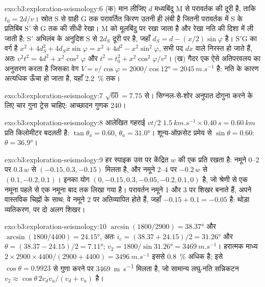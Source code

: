 \begin{solution}{exo:b3:exploration-seismology:6}
(क) मान लीजिए $d$ मध्यबिंदु M से परावर्तक की दूरी है, ताकि
$t_0 = 2d/v$। स्रोत S से ग्राही G तक परावर्तित किरण उतनी ही लंबी है जितनी
परावर्तक में S के प्रतिबिंब S$'$ से G तक की सीधी रेखा। M को मूलबिंदु पर रखा जाता है और रेखा नति की दिशा में ली जाती है;
S$'$ अभिलंब के अनुदिश S से $2d_S$ दूरी पर है, जहाँ
$d_S = d - (x/2)\sin\varphi$ है। S$'$G का वर्ग है
$x^2 + 4d_S^2 + 4d_Sx\sin\varphi = x^2 + 4d^2 - x^2\sin^2\varphi$, सभी पद
$dx$ वाले निरस्त हो जाते हैं, अतः $v^2t^2 = 4d^2 + x^2\cos^2\varphi$ और
$t^2 = t_0^2 + x^2\cos^2\varphi/v^2$। (ख) गैदर एक ऐसे अतिपरवलय का अनुसरण करता है जिसका वेग
$V = v/\cos\varphi = 2000/\cos\ang{12} = \qty{2045}{m.s^{-1}}$ है: नति के कारण
 अत्यधिक ऊँचा हो जाता है, यहाँ \qty{2.2}{\percent} तक।
\end{solution}

\begin{solution}{exo:b3:exploration-seismology:7}
$\sqrt{60} = 7.75$ से। सिग्नल-से-शोर अनुपात दोगुना करने के लिए चार गुना
ट्रेस चाहिए: आच्छादन गुणक 240।
\end{solution}

\begin{solution}{exo:b3:exploration-seismology:8}
आलेखित गहराई $vt/2$ $\qty{1.5}{km.s^{-1}}\times\qty{0.40}{s}
= \qty{0.60}{km}$ प्रति किलोमीटर बदलती है: $\tan\theta_a = 0.60$, $\theta_a = \ang{31.0}$।
शून्य-ऑफ़सेट प्रमेय से $\sin\theta = 0.60$: $\theta = \ang{36.9}$।
\end{solution}

\begin{solution}{exo:b3:exploration-seismology:9}
हर स्पाइक उस पर केंद्रित $w$ की एक प्रति रखता है: नमूने 0--2 पर $0.3\,w$ से
$(-0.15, 0.3, -0.15)$ मिलता है, और नमूने 2--4 पर $-0.2\,w$ से $(0.1, -0.2, 0.1)$।
इनका योग $(0, -0.15, 0.3, -0.05, -0.2, 0.1, 0)$ है, जो श्रेणी से एक नमूना पहले से
एक नमूना बाद तक लिखा गया है। परावर्तन नमूने 1 और 3 पर शिखर बनाते हैं, अपने वास्तविक चिह्नों के साथ;
वे नमूने 2 पर अतिव्यापित होते हैं, जहाँ $-0.15 + 0.1 = -0.05$ है:
थोड़ा व्यतिकरण, पर दो अलग शिखर।
\end{solution}

\begin{solution}{exo:b3:exploration-seismology:10}
$\arcsin(1800/2900) = \ang{38.37}$ और $\arcsin(1800/4400) = \ang{24.15}$, अतः
$i_c = (38.37 + 24.15)/2 = \ang{31.26}$ और $\theta = (38.37 - 24.15)/2 =
\ang{7.11}$; $v_2 = 1800/\sin\ang{31.26} = \qty{3469}{m.s^{-1}}$। हरात्मक माध्य
$2\times2900\times4400/(2900 + 4400) = \qty{3496}{m.s^{-1}}$ इससे
\qty{0.8}{\percent} अधिक है; इसे $\cos\theta = 0.9923$ से गुणा करने पर
\qty{3469}{m.s^{-1}} मिलता है, जो सामान्य लघु-नति सन्निकटन
$v_2 \approx \cos\theta\,2v_dv_u/(v_d + v_u)$ है।
\end{solution}

